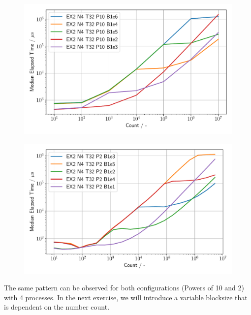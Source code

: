 \begin{figure}[h]
\centering
    \begin{minipage}{.5\textwidth}
        \centering
        \includegraphics[width=1.0\linewidth]{figures/Ex2_4.pdf}
        \label{Ex2_4_p}
    \end{minipage}%
    \begin{minipage}{.5\textwidth}
        \centering
        \includegraphics[width=1.0\linewidth]{figures/Ex2_5.pdf}
        \label{Ex2_5_p}
    \end{minipage}
\end{figure}

The same pattern can be observed for both configurations (Powers of 10 and 2) with 4 processes. 
In the next exercise, we will introduce a variable blocksize that is dependent on the number count.


